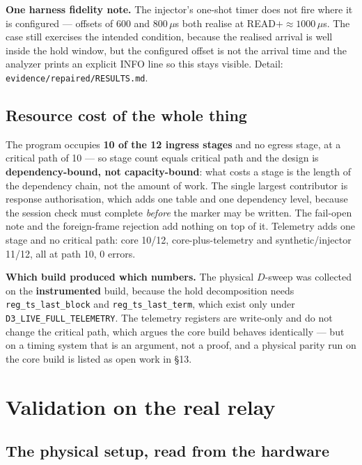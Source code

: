 \documentclass[10pt,a4paper,oneside]{article}
\newcommand{\code}[1]{\texttt{\small #1}}
\begin{document}
\textbf{One harness fidelity note.} The injector's one-shot timer does not fire where it is
configured --- offsets of 600 and 800\,$\mu$s both realise at READ${+}{\approx}1000\,\mu$s.
The case still exercises the intended condition, because the realised arrival is well inside
the hold window, but the configured offset is not the arrival time and the analyzer prints an
explicit INFO line so this stays visible. Detail: \code{evidence/repaired/RESULTS.md}.

\subsection{Resource cost of the whole thing}

The program occupies \textbf{10 of the 12 ingress stages} and no egress stage, at a critical
path of 10 --- so stage count equals critical path and the design is
\textbf{dependency-bound, not capacity-bound}: what costs a stage is the length of the
dependency chain, not the amount of work. The single largest contributor is response
authorisation, which adds one table and one dependency level, because the session check must
complete \emph{before} the marker may be written. The fail-open note and the foreign-frame
rejection add nothing on top of it. Telemetry adds one stage and no critical path: core
10/12, core-plus-telemetry and synthetic/injector 11/12, all at path 10, 0 errors.

\textbf{Which build produced which numbers.} The physical $D$-sweep was collected on the
\textbf{instrumented} build, because the hold decomposition needs \code{reg\_ts\_last\_block}
and \code{reg\_ts\_last\_term}, which exist only under \code{D3\_LIVE\_FULL\_TELEMETRY}. The
telemetry registers are write-only and do not change the critical path, which argues the core
build behaves identically --- but on a timing system that is an argument, not a proof, and a
physical parity run on the core build is listed as open work in \S13.

\section{Validation on the real relay}
\label{sec:physical}

\subsection{The physical setup, read from the hardware}
\end{document}
